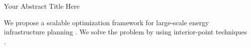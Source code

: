 \documentclass{article}
\newcommand{\AbstractTitle}{Your Abstract Title Here}
\begin{document}
\AbstractTitle

We propose a scalable optimization framework for large-scale energy infrastructure planning \cite{nocedal2006numerical}. We solve the problem by using interior-point techniques \cite{wachter2006implementation}.
\end{document}
